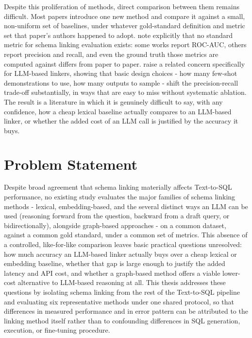 Despite this proliferation of methods, direct comparison between them remains difficult. Most papers introduce one new method and compare it against a small, non-uniform set of baselines, under whatever gold-standard definition and metric set that paper's authors happened to adopt. \citet{glass2025} note explicitly that no standard metric for schema linking evaluation exists: some works report ROC-AUC, others report precision and recall, and even the ground truth those metrics are computed against differs from paper to paper. \citet{katsogiannismeimarakis2026} raise a related concern specifically for LLM-based linkers, showing that basic design choices - how many few-shot demonstrations to use, how many outputs to sample - shift the precision-recall trade-off substantially, in ways that are easy to miss without systematic ablation. The result is a literature in which it is genuinely difficult to say, with any confidence, how a cheap lexical baseline actually compares to an LLM-based linker, or whether the added cost of an LLM call is justified by the accuracy it buys.

\section{Problem Statement}\label{sec:1-2}

Despite broad agreement that schema linking materially affects Text-to-SQL performance, no existing study evaluates the major families of schema linking methods - lexical, embedding-based, and the several distinct ways an LLM can be used (reasoning forward from the question, backward from a draft query, or bidirectionally), alongside graph-based approaches - on a common dataset, against a common gold standard, under a common set of metrics. This absence of a controlled, like-for-like comparison leaves basic practical questions unresolved: how much accuracy an LLM-based linker actually buys over a cheap lexical or embedding baseline, whether that gap is large enough to justify the added latency and API cost, and whether a graph-based method offers a viable lower-cost alternative to LLM-based reasoning at all. This thesis addresses these questions by isolating schema linking from the rest of the Text-to-SQL pipeline and evaluating six representative methods under one shared protocol, so that differences in measured performance and in error pattern can be attributed to the linking method itself rather than to confounding differences in SQL generation, execution, or fine-tuning procedure.

